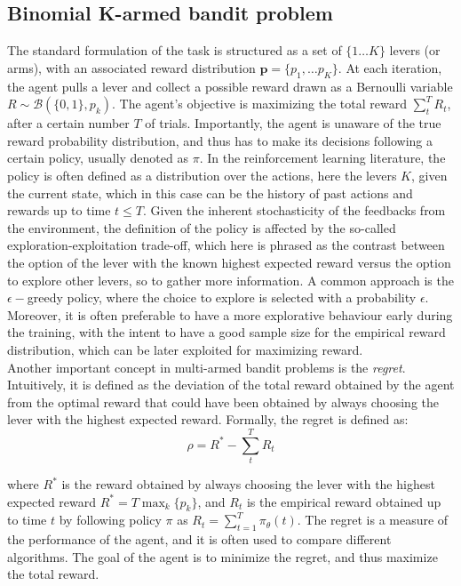\subsection{Binomial K-armed bandit problem}
\hfill \break
\noindent The standard formulation of the task is structured as a set of $\{1\dots K\}$ levers (or arms), with an associated reward distribution $\mathbf{p}=\{p_{1}, \ldots p_{K}\}$. At each iteration, the agent pulls a lever and collect a possible reward drawn as a Bernoulli variable $R\sim
\mathcal{B}(\{0,1\},p_{k})$. The agent's objective is maximizing the total reward
$\sum^{T}_{t} R_{t}$, after a certain number $T$ of trials. Importantly, the agent is unaware of the true reward probability distribution, and thus has to make its decisions following a certain policy, usually denoted as $\pi$. In the reinforcement learning literature, the policy is often defined as
a distribution over the actions, here the levers $K$, given the current state, which in this case can be the history of past actions and rewards up to time $t\leq T$. Given the inherent stochasticity of the feedbacks from the environment, the definition of the policy is affected by the so-called
exploration-exploitation trade-off, which here is phrased as the contrast between the option of the lever with the known highest expected reward versus the option to explore other levers, so to gather more information. A common approach is the $\epsilon-$greedy policy, where the choice to explore is
selected with a probability $\epsilon$. Moreover, it is often preferable to have a more explorative behaviour early during the training, with the intent to have a good sample size for the empirical reward distribution, which can be later exploited for maximizing reward.\\
Another important concept in multi-armed bandit problems is the \textit{regret}. Intuitively, it is defined as the deviation of the total reward obtained by the agent from the optimal reward that could have been obtained by always choosing the lever with the highest expected reward. Formally, the regret is defined as:
\begin{equation}
    \rho=R^{*} - \sum^{T}_{t} R_{t}
\end{equation}

\noindent where $R^{*}$ is the reward obtained by always choosing the lever with the highest expected reward $R^{*}=T\max_{k}\{p_{k}\}$, and $R_{t}$ is the empirical reward obtained up to time $t$ by following policy $\pi$ as $R_{t}=\sum^{T}_{t=1}\pi_{\theta}(t)$.
The regret is a measure of the performance of the agent, and it is often used to compare different algorithms. The goal of the agent is to minimize the regret, and thus maximize the total reward.

